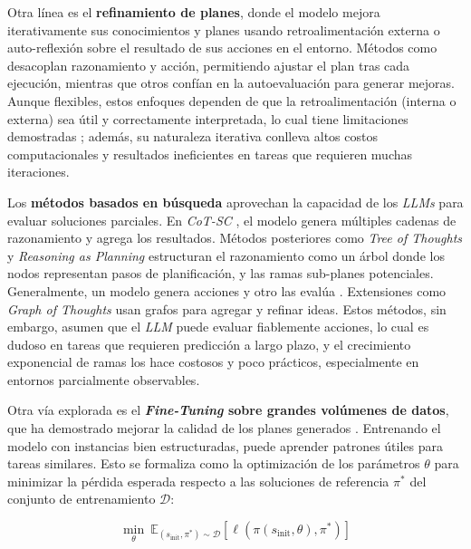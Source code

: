Otra línea es el \textbf{refinamiento de planes}, donde el modelo mejora iterativamente sus conocimientos y planes usando retroalimentación externa o auto-reflexión sobre el resultado de sus acciones en el entorno. Métodos como \parencite{yao2023react, singh2023progprompt, sun2023adaplanner} desacoplan razonamiento y acción, permitiendo ajustar el plan tras cada ejecución, mientras que otros \parencite{shinn2023reflexion, madaan2023self, kim2023language} confían en la autoevaluación para generar mejoras. Aunque flexibles, estos enfoques dependen de que la retroalimentación (interna o externa) sea útil y correctamente interpretada, lo cual tiene limitaciones demostradas \parencite{verma2024brittle, huang2023large, stechly2024self}; además, su naturaleza iterativa conlleva altos costos computacionales y resultados ineficientes en tareas que requieren muchas iteraciones.

Los \textbf{métodos basados en búsqueda} aprovechan la capacidad de los \textit{LLMs} para evaluar soluciones parciales. En \textit{CoT-SC} \parencite{wang2022self}, el modelo genera múltiples cadenas de razonamiento y agrega los resultados. Métodos posteriores como \textit{Tree of Thoughts} \parencite{yao2023tree} y \textit{Reasoning as Planning} \parencite{hao2023reasoning} estructuran el razonamiento como un árbol donde los nodos representan pasos de planificación, y las ramas sub-planes potenciales. Generalmente, un modelo genera acciones y otro las evalúa \parencite{chen2024tree}. Extensiones como \textit{Graph of Thoughts} \parencite{besta2024graph} usan grafos para agregar y refinar ideas. Estos métodos, sin embargo, asumen que el \textit{LLM} puede evaluar fiablemente acciones, lo cual es dudoso en tareas que requieren predicción a largo plazo, y el crecimiento exponencial de ramas los hace costosos y poco prácticos, especialmente en entornos parcialmente observables.

Otra vía explorada es el \textbf{\textit{Fine-Tuning} sobre grandes volúmenes de datos}, que ha demostrado mejorar la calidad de los planes generados \parencite{bohnet2024exploring, aghzal2023can, li2024unlocking}. Entrenando el modelo con instancias bien estructuradas, puede aprender patrones útiles para tareas similares. Esto se formaliza como la optimización de los parámetros $\theta$ para minimizar la pérdida esperada respecto a las soluciones de referencia $\pi^*$ del conjunto de entrenamiento $\mathcal{D}$:

\[
\min_\theta \ \mathbb{E}_{(s_{\text{init}}, \pi^*) \sim \mathcal{D}} \left[ \ell\left(\pi(s_{\text{init}}, \theta), \pi^*\right) \right]
\]

